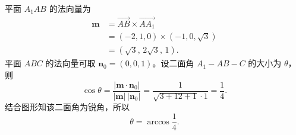 \begin{answer}
平面 $A_1AB$ 的法向量为
\nopagebreak[4]
\[\begin{aligned}
\boldsymbol m&=\overrightarrow{AB}\times\overrightarrow{AA_1}\\
&=(-2,1,0)\times(-1,0,\sqrt3)\\
&=(\sqrt3,\,2\sqrt3,\,1).
\end{aligned}\]
平面 $ABC$ 的法向量可取 $\boldsymbol n_0=(0,0,1)$。设二面角 $A_1-AB-C$ 的大小为 $\theta$，则
\nopagebreak[4]
\[\cos\theta
=\frac{|\boldsymbol m\cdot\boldsymbol n_0|}{|\boldsymbol m|\,|\boldsymbol n_0|}
=\frac{1}{\sqrt{3+12+1}\cdot1}
=\frac14.\]
结合图形知该二面角为锐角，所以
\nopagebreak[4]
\[\theta=\arccos\frac14.\]



\end{answer}
